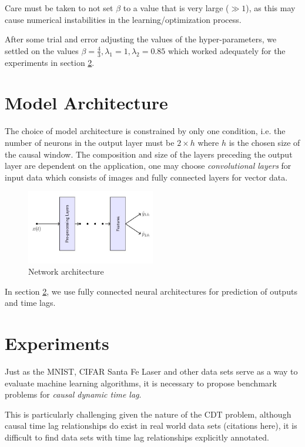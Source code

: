\documentclass[twoside]{article}
\begin{document}
Care must be taken to not set $\beta$ to a value that is very large ($\gg 1$), as this may cause numerical instabilities in the learning/optimization process. 

After some trial and error adjusting the values of the hyper-parameters, we settled on the values $\beta = \frac{4}{3}, \lambda_1 = 1, \lambda_2 = 0.85$ which worked adequately for the experiments in section \ref{sec:exp}.

\section{Model Architecture}

The choice of model architecture is constrained by only one condition, i.e. the number of neurons in the output layer must be $2 \times h$ where $h$ is the chosen size of the causal window. The composition and size of the layers preceding the output layer are dependent on the application, one may choose \emph{convolutional layers} for input data which consists of images and fully connected layers for vector data.

\begin{figure}[h]
\vspace{.3in}
\centerline{\includegraphics[width=0.5\textwidth]{figures/network.jpg}}
\vspace{.3in}
\caption{Network architecture}
\label{fig:network}
\end{figure}


In section \ref{sec:exp}, we use fully connected neural architectures for prediction of outputs and time lags.


\section{Experiments}\label{sec:exp}


Just as the MNIST, CIFAR Santa Fe Laser and other data sets serve as a way to evaluate machine learning
algorithms, it is necessary to propose benchmark problems for \emph{causal dynamic time lag}.

This is particularly challenging given the nature of the CDT problem, although causal time lag
relationships do exist in real world data sets (citations here), it is difficult to find data sets
with time lag relationships explicitly annotated.
\end{document}
